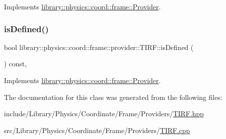 Implements \hyperlink{classlibrary_1_1physics_1_1coord_1_1frame_1_1_provider_a796fd2dd337f1304a0e9acf573ce2550}{library\+::physics\+::coord\+::frame\+::\+Provider}.

\mbox{\label{classlibrary_1_1physics_1_1coord_1_1frame_1_1provider_1_1_t_i_r_f_a3656639fda8a7b991335752559d7594b}} 
\subsubsection{\texorpdfstring{is\+Defined()}{isDefined()}}
{\footnotesize\ttfamily bool library\+::physics\+::coord\+::frame\+::provider\+::\+T\+I\+R\+F\+::is\+Defined (\begin{DoxyParamCaption}{ }\end{DoxyParamCaption}) const\hspace{0.3cm}{\ttfamily [override]}, {\ttfamily [virtual]}}



Implements \hyperlink{classlibrary_1_1physics_1_1coord_1_1frame_1_1_provider_ae7cd093febf2b20f71400f9f79442774}{library\+::physics\+::coord\+::frame\+::\+Provider}.



The documentation for this class was generated from the following files\+:\begin{DoxyCompactItemize}
\item 
include/\+Library/\+Physics/\+Coordinate/\+Frame/\+Providers/\hyperlink{_t_i_r_f_8hpp}{T\+I\+R\+F.\+hpp}\item 
src/\+Library/\+Physics/\+Coordinate/\+Frame/\+Providers/\hyperlink{_t_i_r_f_8cpp}{T\+I\+R\+F.\+cpp}\end{DoxyCompactItemize}
